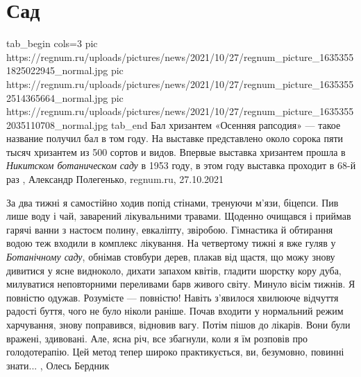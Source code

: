  
 
 
 
 
\chapter{Сад}
\label{sec:slova.sad}

\ifcmt
  tab_begin cols=3
     pic https://regnum.ru/uploads/pictures/news/2021/10/27/regnum_picture_16353551825022945_normal.jpg
     pic https://regnum.ru/uploads/pictures/news/2021/10/27/regnum_picture_16353552514365664_normal.jpg
		 pic https://regnum.ru/uploads/pictures/news/2021/10/27/regnum_picture_16353552035110708_normal.jpg
  tab_end
\fi
Бал хризантем «Осенняя рапсодия» — такое название получил бал в том году. На
выставке представлено около сорока пяти тысяч хризантем из 500 сортов и видов.
Впервые выставка хризантем прошла в \emph{Никитском ботаническом саду} в 1953 году, в
этом году выставка проходит в 68-й раз
, 
Александр Полегенько, regnum.ru, 27.10.2021


За два тижні я самостійно ходив попід стінами, тренуючи м’язи, біцепси. Пив
лише воду і чай, заварений лікувальними травами. Щоденно очищався і приймав
гарячі ванни з настоєм полину, евкаліпту, звіробою. Гімнастика й обтирання
водою теж входили в комплекс лікування.  На четвертому тижні я вже гуляв у
\emph{Ботанічному саду}, обнімав стовбури дерев, плакав від щастя, що можу
знову дивитися у ясне видноколо, дихати запахом квітів, гладити шорстку кору
дуба, милуватися неповторними переливами барв живого світу.  Минуло вісім
тижнів. Я повністю одужав. Розумієте — повністю! Навіть з’явилося хвилююче
відчуття радості буття, чого не було ніколи раніше. Почав входити у нормальний
режим харчування, знову поправився, відновив вагу. Потім пішов до лікарів. Вони
були вражені, здивовані. Але, ясна річ, все збагнули, коли я їм розповів про
голодотерапію. Цей метод тепер широко практикується, ви, безумовно, повинні
знати...
, Олесь Бердник
